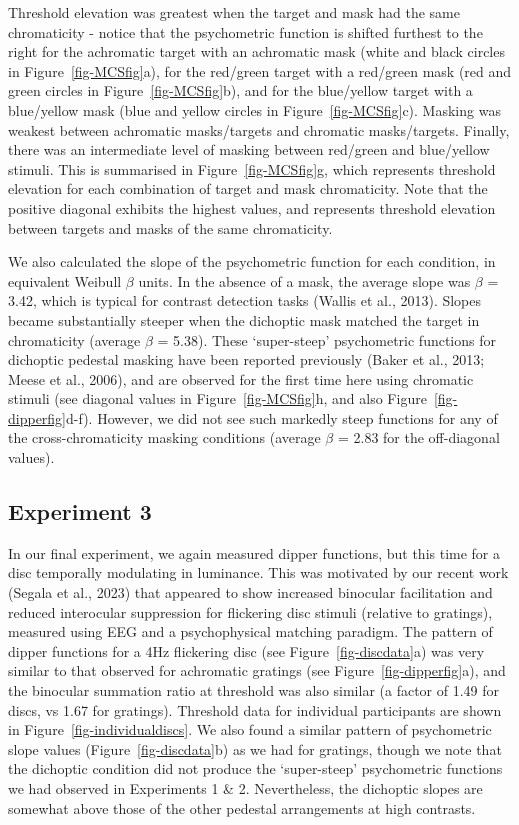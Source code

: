 \documentclass[
  letterpaper,
  DIV=11,
  numbers=noendperiod]{scrartcl}
\begin{document}
Threshold elevation was greatest when the target and mask had the same
chromaticity - notice that the psychometric function is shifted furthest
to the right for the achromatic target with an achromatic mask (white
and black circles in Figure~\ref{fig-MCSfig}a), for the red/green target
with a red/green mask (red and green circles in
Figure~\ref{fig-MCSfig}b), and for the blue/yellow target with a
blue/yellow mask (blue and yellow circles in Figure~\ref{fig-MCSfig}c).
Masking was weakest between achromatic masks/targets and chromatic
masks/targets. Finally, there was an intermediate level of masking
between red/green and blue/yellow stimuli. This is summarised in
Figure~\ref{fig-MCSfig}g, which represents threshold elevation for each
combination of target and mask chromaticity. Note that the positive
diagonal exhibits the highest values, and represents threshold elevation
between targets and masks of the same chromaticity.

We also calculated the slope of the psychometric function for each
condition, in equivalent Weibull \(\beta\) units. In the absence of a
mask, the average slope was \(\beta\) = 3.42, which is typical for
contrast detection tasks (Wallis et al., 2013). Slopes became
substantially steeper when the dichoptic mask matched the target in
chromaticity (average \(\beta\) = 5.38). These `super-steep'
psychometric functions for dichoptic pedestal masking have been reported
previously (Baker et al., 2013; Meese et al., 2006), and are observed
for the first time here using chromatic stimuli (see diagonal values in
Figure~\ref{fig-MCSfig}h, and also Figure~\ref{fig-dipperfig}d-f).
However, we did not see such markedly steep functions for any of the
cross-chromaticity masking conditions (average \(\beta\) = 2.83 for the
off-diagonal values).

\hypertarget{experiment-3}{%
\subsection{Experiment 3}\label{experiment-3}}

In our final experiment, we again measured dipper functions, but this
time for a disc temporally modulating in luminance. This was motivated
by our recent work (Segala et al., 2023) that appeared to show increased
binocular facilitation and reduced interocular suppression for
flickering disc stimuli (relative to gratings), measured using EEG and a
psychophysical matching paradigm. The pattern of dipper functions for a
4Hz flickering disc (see Figure~\ref{fig-discdata}a) was very similar to
that observed for achromatic gratings (see Figure~\ref{fig-dipperfig}a),
and the binocular summation ratio at threshold was also similar (a
factor of 1.49 for discs, vs 1.67 for gratings). Threshold data for
individual participants are shown in Figure~\ref{fig-individualdiscs}.
We also found a similar pattern of psychometric slope values
(Figure~\ref{fig-discdata}b) as we had for gratings, though we note that
the dichoptic condition did not produce the `super-steep' psychometric
functions we had observed in Experiments 1 \& 2. Nevertheless, the
dichoptic slopes are somewhat above those of the other pedestal
arrangements at high contrasts.
\end{document}
